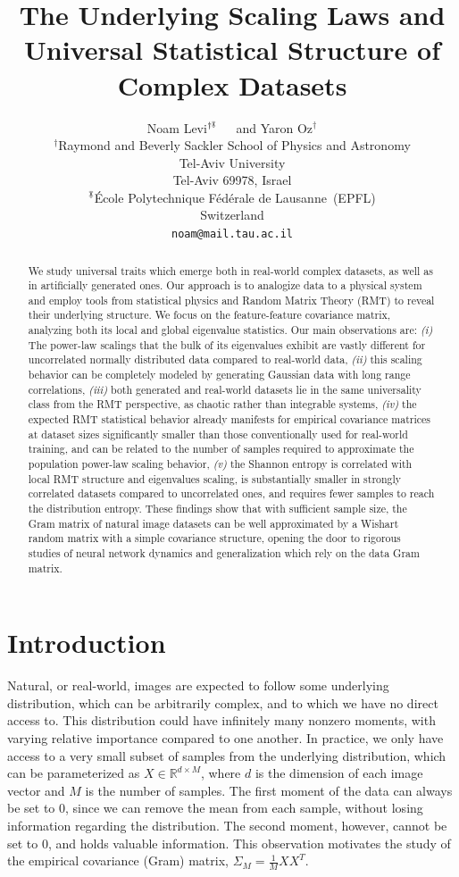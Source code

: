 \documentclass{article}
\title{The Underlying Scaling Laws and Universal Statistical Structure of Complex Datasets }
\author{%
  Noam Levi$^{\dagger\mySymbol[black]}$~~~and Yaron Oz$^{\dagger}$ \\
  $^{\dagger}$Raymond and Beverly Sackler School of Physics and Astronomy\\
  Tel-Aviv University\\
  Tel-Aviv 69978, Israel \\
  $^{\mySymbol[black]}$\'Ecole Polytechnique F\'ed\'erale de Lausanne~(EPFL)\\ 
Switzerland\\
  \texttt{noam@mail.tau.ac.il} \\
}
\begin{document}
\maketitle


\begin{abstract}

We study universal traits which emerge both in real-world complex datasets, as well as in artificially generated ones. Our approach is to analogize data to a physical system and employ tools from statistical physics and Random Matrix Theory (RMT) to reveal their underlying structure. We focus on the feature-feature covariance matrix, analyzing both its local and global eigenvalue statistics. Our main observations are: {\it(i)} The power-law scalings that the bulk of its eigenvalues exhibit are vastly different for uncorrelated normally distributed data compared to real-world data, {\it(ii)} this scaling behavior can be completely modeled by generating Gaussian data with long range correlations, {\it(iii)} both generated and real-world datasets lie in the same universality class from the RMT perspective, as chaotic rather than integrable systems, {\it(iv)} the expected RMT statistical behavior already manifests for empirical covariance matrices at dataset sizes significantly smaller than those conventionally used for real-world training, and can be related to the number of samples required to approximate the population power-law scaling behavior, {\it(v)} the Shannon entropy is correlated with local RMT structure and eigenvalues scaling, is substantially smaller in strongly correlated datasets compared to uncorrelated ones, and requires fewer samples to reach the distribution entropy. These findings show that with sufficient sample size, the Gram matrix of natural image datasets can be well approximated by a Wishart random matrix with a simple covariance structure, opening the door to rigorous studies of neural network dynamics and generalization which rely on the data Gram matrix.

\end{abstract}




\section{Introduction}

Natural, or real-world, images are expected to follow some underlying distribution, which can be arbitrarily complex, and to which we have no direct access to. This distribution could have infinitely many nonzero moments, with varying relative importance compared to one another. In practice, we only have access to a very small subset of samples from the underlying distribution, which can be parameterized as $X \in \mathbb{R}^{d\times M}$, where $d$ is the dimension of each image vector and $M$ is the number of samples. The first moment of the data can always be set to $0$, since we can remove the mean from each sample, without losing information regarding the distribution. The second moment, however, cannot be set to $0$, and holds valuable information. This observation motivates the study of the empirical covariance (Gram) matrix, $\Sigma_M = \tfrac{1}{M} X X^T$. 
\end{document}
